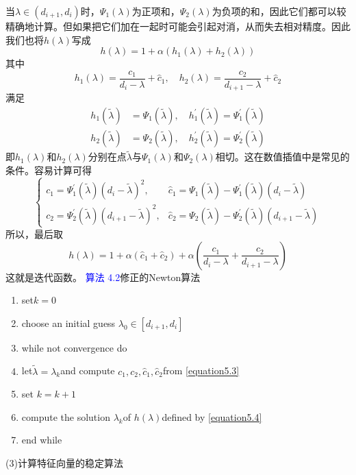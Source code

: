 \documentclass[12pt,a4paper]{article}
\begin{document}
当$\lambda \in (d_{i+1},d_i)$时，$\Psi_{1}(\lambda)$为正项和，$\Psi_{2}(\lambda)$为负项的和，因此它们都可以较精确地计算。但如果把它们加在一起时可能会引起对消，从而失去相对精度。因此我们也将$h(\lambda)$写成$$h(\lambda)=1+\alpha(h_1(\lambda)+h_2(\lambda))$$
其中$$
h_{1}(\lambda)=\frac{c_{1}}{d_{i}-\lambda}+\hat{c}_{1}, \quad h_{2}(\lambda)=\frac{c_{2}}{d_{i+1}-\lambda}+\hat{c}_{2}
$$
满足$$
\begin{aligned} h_{1}(\tilde{\lambda}) &=\Psi_{1}(\tilde{\lambda}), \quad h_{1}^{\prime}(\tilde{\lambda})=\Psi_{1}^{\prime}(\tilde{\lambda}) \\ h_{2}(\tilde{\lambda}) &=\Psi_{2}(\tilde{\lambda}), \quad h_{2}^{\prime}(\tilde{\lambda})=\Psi_{2}^{\prime}(\tilde{\lambda}) \end{aligned}
$$
即$h_{1}(\lambda)$和$h_{2}(\lambda)$分别在点$\tilde{\lambda}$与$\Psi_{1}(\lambda)$和$\Psi_{2}(\lambda)$相切。这在数值插值中是常见的条件。容易计算可得\begin{equation}
\left\{\begin{array}{ll}{c_{1}=\Psi_{1}^{\prime}(\tilde{\lambda})\left(d_{i}-\tilde{\lambda}\right)^{2},} & {\hat{c}_{1}=\Psi_{1}(\tilde{\lambda})-\Psi_{1}^{\prime}(\tilde{\lambda})\left(d_{i}-\tilde{\lambda}\right)} \\ {c_{2}=\Psi_{2}^{\prime}(\tilde{\lambda})\left(d_{i+1}-\tilde{\lambda}\right)^{2},} & {\hat{c}_{2}=\Psi_{2}(\tilde{\lambda})-\Psi_{2}^{\prime}(\tilde{\lambda})\left(d_{i+1}-\tilde{\lambda}\right)}\end{array}\right.
\label{equation5.3}
\end{equation}
所以，最后取\begin{equation}
h(\lambda)=1+\alpha\left(\hat{c}_{1}+\hat{c}_{2}\right)+\alpha\left(\frac{c_{1}}{d_{i}-\lambda}+\frac{c_{2}}{d_{i+1}-\lambda}\right)
\label{equation5.4}
\end{equation}
这就是迭代函数。
\textcolor{blue}{算法 4.2}\quad 修正的Newton算法
\begin{enumerate}[1:]
	\item set$k=0$
	\item choose an initial guess $\lambda _0\in [d_{i+1},d_i]$
	\item while not convergence do
	\item \quad let$\tilde{\lambda}=\lambda _k$and compute $c_1,c_2,\hat{c}_{1},\hat{c}_{2}$from \ref{equation5.3}
	\item \quad set $k=k+1$
	\item \quad compute the solution $\lambda _k$of $h(\lambda)$defined by \ref{equation5.4}
	\item end while
\end{enumerate}
(3)计算特征向量的稳定算法
\end{document}
